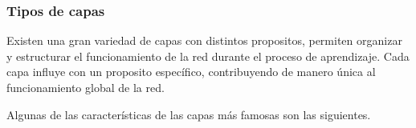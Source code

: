 
\subsubsection{Tipos de capas}



Existen una gran variedad de capas con distintos propositos, permiten organizar y estructurar el funcionamiento de la red durante el proceso de aprendizaje. Cada capa influye con un proposito específico, contribuyendo de manero única al funcionamiento global de la red.

Algunas de las características de las capas más famosas son las siguientes.

